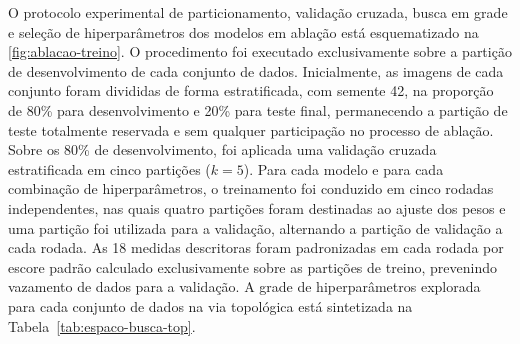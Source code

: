 \label{subsec:protocolo-ablacao}
O protocolo experimental de particionamento, validação cruzada, busca em grade e seleção de hiperparâmetros dos modelos em ablação está esquematizado na \ref{fig:ablacao-treino}. O procedimento foi executado exclusivamente sobre a partição de desenvolvimento de cada conjunto de dados. Inicialmente, as imagens de cada conjunto foram divididas de forma estratificada, com semente 42, na proporção de 80\% para desenvolvimento e 20\% para teste final, permanecendo a partição de teste totalmente reservada e sem qualquer participação no processo de ablação. Sobre os 80\% de desenvolvimento, foi aplicada uma validação cruzada estratificada em cinco partições ($k = 5$). Para cada modelo e para cada combinação de hiperparâmetros, o treinamento foi conduzido em cinco rodadas independentes, nas quais quatro partições foram destinadas ao ajuste dos pesos e uma partição foi utilizada para a validação, alternando a partição de validação a cada rodada. As 18 medidas descritoras foram padronizadas em cada rodada por escore padrão calculado exclusivamente sobre as partições de treino, prevenindo vazamento de dados para a validação. A grade de hiperparâmetros explorada para cada conjunto de dados na via topológica está sintetizada na Tabela~\ref{tab:espaco-busca-top}.



\begin{table}[htb]
\centering
\caption{Espaço de busca de hiperparâmetros estratificado por conjunto de dados na via topológica.}
\label{tab:espaco-busca-top}
\label{subsec:res-ajuste}
\small
{}
\end{table}

